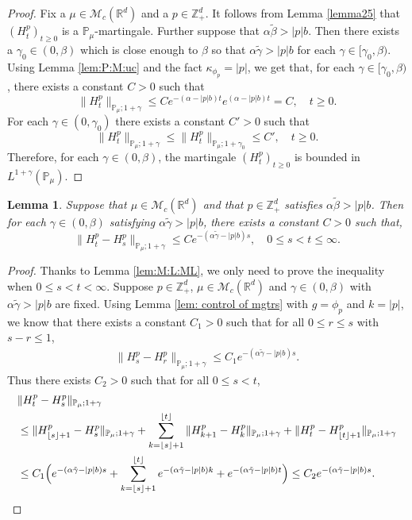\documentclass[12pt,a4paper]{amsart}
\theoremstyle{plain}
\newtheorem{lem}[thm]{Lemma}
\theoremstyle{definition}
\numberwithin{equation}{section}
\begin{document}
\begin{proof}
  Fix a $\mu \in \mathcal M_c(\mathbb R^d)$ and a $p \in \mathbb Z_+^d$.
  It follows from Lemma \ref{lemma25} that $(H_t^p)_{t\geq 0}$ is a $\mathbb P_\mu$-martingale.
  Further suppose that $\alpha \tilde \beta > |p| b$.
  Then there exists a $\gamma_0 \in (0,\beta)$ which is close enough to $\beta$ so that $\alpha\tilde \gamma>|p|b$ for each $\gamma\in [\gamma_0, \beta)$.
  Using  Lemma \ref{lem:P:M:uc} and the fact $\kappa_{\phi_p}=|p|$, we get that, for each $\gamma\in [\gamma_0, \beta)$, there exists a constant $C>0$ such that
  \[
    \|H_t^p\|_{\mathbb P_\mu;1+\gamma}
    \leq C e^{-(\alpha-|p|b)t}e^{(\alpha-|p|b)t}
    = C
    , \quad t\geq 0.
  \]
  For each $\gamma\in (0, \gamma_0)$ there exists a constant $C'>0$ such that
  \[
    \| H_t^p \|_{\mathbb P_\mu;1+\gamma}
    \leq \| H_t^p \|_{\mathbb P_\mu;1+\gamma_0}
    \leq C',
    \quad t\geq 0.
  \]
  Therefore, for each $\gamma \in (0,\beta)$, the martingale $(H_t^p)_{t\geq 0}$ is bounded in $L^{1+\gamma}(\mathbb{P}_{\mu})$.
\end{proof}

\begin{lem}
  \label{lem: control of wt}
  Suppose that $\mu\in \mathcal M_c(\mathbb R^d)$ and that $p \in \mathbb Z_+^d$ satisfies $\alpha \tilde \beta > |p|b$.
  Then for each $\gamma \in (0,\beta)$ satisfying $\alpha \tilde \gamma > |p|b$, there exists a constant $C> 0$ such that,
  \[
    \|H^p_t-H^p_s\|_{\mathbb{P}_{\mu};1+\gamma}
    \leq C e^{-(\alpha \tilde \gamma-|p|b)s},
    \quad 0 \leq s < t \leq \infty.
  \]
\end{lem}

\begin{proof}
  Thanks to Lemma \ref{lem:M:L:ML}, we only  need to prove the inequality  when $0\leq s < t<\infty$.
  Suppose $p\in \mathbb{Z}_+^d$, $\mu\in \mathcal M_c(\mathbb R^d)$ and  $\gamma \in (0,\beta)$ with $\alpha \tilde \gamma > |p|b$ are fixed.
  Using Lemma \ref{lem: control of mgtrs} with $g=\phi_p$ and $k=|p|$,  we know that there exists a constant $C_1>0$ such that for all $0\leq r\leq s $ with $s-r\leq1$,
  \begin{align}
    \|H^p_s-H^p_r\|_{\mathbb P_\mu; 1+\gamma}
    \leq  C_1 e^{-(\alpha\tilde \gamma-|p|b)s}.
  \end{align}
  Thus there exists $C_2>0$ such that for all $0\leq s<t$,
  \begin{align}
    & \|H^p_t-H^p_s\|_{\mathbb{P}_{\mu};1+\gamma} \\
    & \leq \|H^p_{\lfloor s \rfloor+1}-H^p_s\|_{\mathbb{P}_{\mu};1+\gamma}+\sum_{k=\lfloor s \rfloor+1}^{\lfloor t \rfloor}\|H^p_{k+1}-H^p_{k}\|_{\mathbb{P}_{\mu};1+\gamma}+\|H^p_t-H^p_{\lfloor t \rfloor+1}\|_{\mathbb{P}_{\mu};1+\gamma} \\
    & \leq C_1 \Big(e^{-(\alpha \tilde \gamma- |p|b) s}+\sum_{k=\lfloor s \rfloor+1}^{\lfloor t \rfloor} e^{-(\alpha \tilde \gamma- |p|b) k} + e^{-(\alpha \tilde \gamma-|p|b) t}\Big)
      \leq C_2e^{-(\alpha \tilde \gamma-|p|b)s}.
      \qedhere
  \end{align}	
\end{proof}
\end{document}
